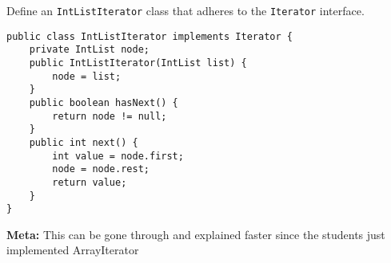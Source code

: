 \question Define an \lstinline$IntListIterator$ class that adheres to the
\lstinline$Iterator$ interface.

\begin{solution}[3in]
\begin{lstlisting}
public class IntListIterator implements Iterator {
    private IntList node;
    public IntListIterator(IntList list) {
        node = list;
    }
    public boolean hasNext() {
        return node != null;
    }
    public int next() {
        int value = node.first;
        node = node.rest;
        return value;
    }
}
\end{lstlisting}
\textbf{Meta:} This can be gone through and explained faster since the students
just implemented ArrayIterator
\end{solution}
